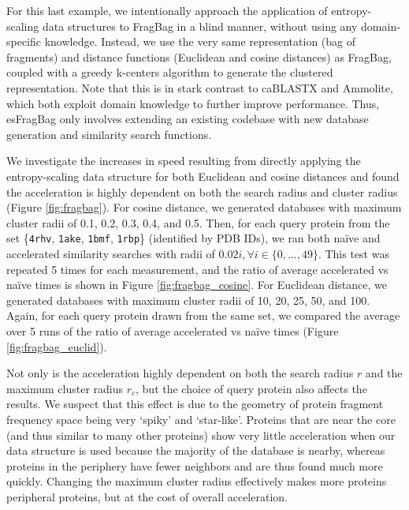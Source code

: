\documentclass[review,preprint,12pt]{elsarticle}
\theoremstyle{definition}
\theoremstyle{remark}
\numberwithin{equation}{section}
\begin{document}
For this last example, we intentionally approach the application of entropy-scaling data structures to FragBag in a blind manner,
without using any domain-specific knowledge.
Instead, we use the very same representation (bag of fragments) and distance functions (Euclidean and cosine distances)
as FragBag, coupled with a greedy k-centers algorithm to generate the clustered representation.
Note that this is in stark contrast to caBLASTX and Ammolite, which both exploit domain knowledge to further improve performance.
Thus, esFragBag only involves extending an existing codebase with new database generation and similarity search functions.

We investigate the increases in speed resulting from directly applying the entropy-scaling data structure for both Euclidean and cosine distances and found the acceleration is highly dependent on both the search radius and cluster radius (Figure \ref{fig:fragbag}).
For cosine distance, we generated databases with maximum cluster radii of 0.1, 0.2, 0.3, 0.4, and 0.5.
Then, for each query protein from the set \{\texttt{4rhv}, \texttt{1ake}, \texttt{1bmf}, \texttt{1rbp}\} (identified by PDB IDs), we ran both na\"ive and accelerated similarity searches with radii of $0.02i, \forall i \in \{0,\ldots,49\}$.
This test was repeated 5 times for each measurement, and the ratio of average accelerated vs na\"ive times is shown in Figure \ref{fig:fragbag_cosine}.
For Euclidean distance, we generated databases with maximum cluster radii of 10, 20, 25, 50, and 100.
Again, for each query protein drawn from the same set, we compared the average over 5 runs of the ratio of average accelerated vs na\"ive times (Figure \ref{fig:fragbag_euclid}).

Not only is the acceleration highly dependent on both the search radius $r$ and the maximum cluster radius $r_c$,
but the choice of query protein also affects the results.
We suspect that this effect is due to the geometry of protein fragment frequency space being very `spiky' and `star-like'.
Proteins that are near the core (and thus similar to many other proteins) show very little acceleration when our data structure is used because the majority of the database is nearby, whereas proteins in the periphery have fewer neighbors and are thus found much more quickly.
Changing the maximum cluster radius effectively makes more proteins peripheral proteins, but at the cost of overall acceleration.
\end{document}

